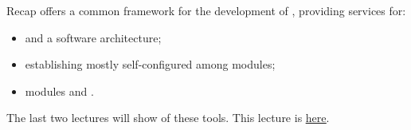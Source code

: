 
\begin{frame}{Recap}
   offers a common framework for the development of , providing services for:
  \begin{itemize}
    \item {} and  a  software architecture;
    \item establishing mostly self-configured  among modules;
    \item modules  and .
  \end{itemize}
  \vspace{.4cm}
  The last two lectures will show  of these tools.
  \newline\newline
  \newline\newline
  This lecture is \href{https://github.com/robmasocco/DAFN23_Robotics_5}{\color{blue}\underline{here}}.
\end{frame}
